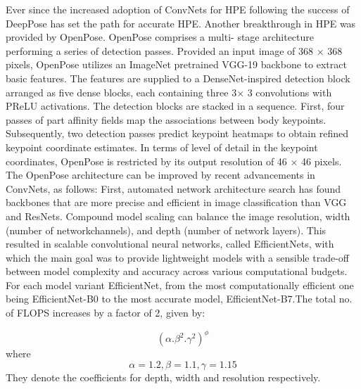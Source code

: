 \documentclass{fisatprojectfinal}
\begin{document}
Ever since the increased adoption of ConvNets for HPE following the
success of DeepPose has set the path for accurate HPE.
Another breakthrough in HPE was provided by OpenPose. OpenPose comprises a multi-
stage architecture performing a series of detection passes.
Provided an input image of 368 × 368 pixels, OpenPose
utilizes an ImageNet pretrained VGG-19 backbone to
extract basic features. The features are
supplied to a DenseNet-inspired detection block
arranged as five dense blocks, each containing three 3×
3 convolutions with PReLU activations. The detection
blocks are stacked in a sequence. First, four passes of part affinity fields map the associations
between body keypoints. Subsequently, two detection
passes predict keypoint heatmaps to
obtain refined keypoint coordinate estimates. In terms of
level of detail in the keypoint coordinates, OpenPose is
restricted by its output resolution of 46 × 46 pixels.
The OpenPose architecture can be improved by recent
advancements in ConvNets, as follows: First, automated
network architecture search has found backbones that are more precise and efficient in image
classification than VGG and ResNets. Compound model scaling can
balance the image resolution, width (number of networkchannels), and depth (number of network layers). This
resulted in scalable convolutional neural networks, called
EfficientNets, with which the main goal was to provide
lightweight models with a sensible trade-off between model
complexity and accuracy across various computational
budgets. For each model variant EfficientNet, from the
most computationally efficient one being EfficientNet-B0
to the most accurate model, EfficientNet-B7.The total no. of FLOPS increases by a factor of 2, given by:
	
	$$
	(\alpha. \beta^2. \gamma ^ 2) ^ \phi
	$$
where $$ \alpha = 1.2 , \beta = 1.1, \gamma = 1.15 $$
They denote the coefficients for depth, width and resolution respectively.
	
\end{document}
